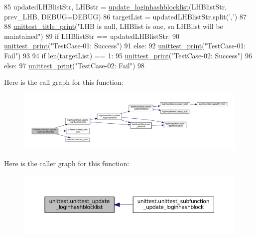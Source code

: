 \begin{DoxyCode}
85     updatedLHBlistStr, LHBstr = \hyperlink{namespaceloginhashblock_a2bcc7ddd0fcc3788572dd77808cb624d}{update\_loginhashblocklist}(LHBlistStr, prev\_LHB, 
      DEBUG=DEBUG)
86     targetList = updatedLHBlistStr.split(\textcolor{stringliteral}{','})
87 
88     \hyperlink{namespaceunittest_a642ec5401fe406315f1489d237ba826e}{unittest\_title\_print}(\textcolor{stringliteral}{"LHB is null, LHBlist is one, su LHBlist will be maintained"})
89     \textcolor{keywordflow}{if} LHBlistStr == updatedLHBlistStr:
90         \hyperlink{namespaceunittest_a217a1a3af5bc9748f2f6194bf79402bc}{unittest\_print}(\textcolor{stringliteral}{"TestCase-01: Success"})
91     \textcolor{keywordflow}{else}:
92         \hyperlink{namespaceunittest_a217a1a3af5bc9748f2f6194bf79402bc}{unittest\_print}(\textcolor{stringliteral}{"TestCase-01: Fail"})
93 
94     \textcolor{keywordflow}{if} len(targetList) == 1:
95         \hyperlink{namespaceunittest_a217a1a3af5bc9748f2f6194bf79402bc}{unittest\_print}(\textcolor{stringliteral}{"TestCase-02: Success"})
96     \textcolor{keywordflow}{else}:
97         \hyperlink{namespaceunittest_a217a1a3af5bc9748f2f6194bf79402bc}{unittest\_print}(\textcolor{stringliteral}{"TestCase-02: Fail"})
98 
\end{DoxyCode}


Here is the call graph for this function\+:\nopagebreak
\begin{figure}[H]
\begin{center}
\leavevmode
\includegraphics[width=350pt]{namespaceunittest_a9e16eaba67b93461be6ea8ef6332507a_cgraph}
\end{center}
\end{figure}




Here is the caller graph for this function\+:\nopagebreak
\begin{figure}[H]
\begin{center}
\leavevmode
\includegraphics[width=350pt]{namespaceunittest_a9e16eaba67b93461be6ea8ef6332507a_icgraph}
\end{center}
\end{figure}




